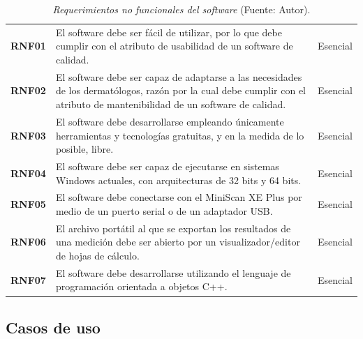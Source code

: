 	\begin{table}[h]
		\small
		\caption[Requerimientos no funcionales del software]{\textit{Requerimientos no funcionales del software} (Fuente: Autor).}
		\centering
		\setlength{\extrarowheight}{\altocelda}
		\begin{tabulary}{\anchotabla}{|c|J|c|}
			\hline
			 &  & \\ \hline
			\textbf{RNF01} & El software debe ser f\'{a}cil de utilizar, por lo que debe cumplir con el atributo de usabilidad de un software de calidad. & Esencial\\ \hline
			\textbf{RNF02} & El software debe ser capaz de adaptarse a las necesidades de los dermat\'{o}logos, raz\'{o}n por la cual debe cumplir con el atributo de mantenibilidad de un software de calidad. & Esencial\\ \hline
			\textbf{RNF03} & El software debe desarrollarse empleando \'{u}nicamente herramientas y tecnolog\'{i}as gratuitas, y en la medida de lo posible, libre. & Esencial\\ \hline
			\textbf{RNF04} & El software debe ser capaz de ejecutarse en sistemas Windows actuales, con arquitecturas de 32 bits y 64 bits. & Esencial\\ \hline
			\textbf{RNF05} & El software debe conectarse con el MiniScan XE Plus por medio de un puerto serial o de un adaptador USB. & Esencial\\ \hline
			\textbf{RNF06} & El archivo port\'{a}til al que se exportan los resultados de una medici\'{o}n debe ser abierto por un visualizador/editor de hojas de c\'{a}lculo. & Esencial\\ \hline
			\textbf{RNF07} & El software debe desarrollarse utilizando el lenguaje de programaci\'{o}n orientada a objetos C++. & Esencial\\ \hline
		\end{tabulary}
	\end{table}
	
\newpage

\subsection{Casos de uso}

